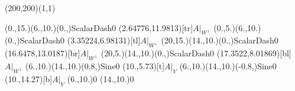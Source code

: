 \unitlength=1bp%

\begin{feynartspicture}(200,200)(1,1)

\FADiagram{}
\FAProp(0.,15.)(6.,10.)(0.,){ScalarDash}{0}
\FALabel(2.64776,11.9813)[tr]{$A|_{W^\perp}$}
\FAProp(0.,5.)(6.,10.)(0.,){ScalarDash}{0}
\FALabel(3.35224,6.98131)[tl]{$A|_{W^\perp}$}
\FAProp(20,15.)(14.,10.)(0.,){ScalarDash}{0}
\FALabel(16.6478,13.0187)[br]{$A|_{W^\perp}$}
\FAProp(20,5.)(14.,10.)(0.,){ScalarDash}{0}
\FALabel(17.3522,8.01869)[bl]{$A|_{W^\perp}$}
\FAProp(6.,10.)(14.,10.)(0.8,){Sine}{0}
\FALabel(10.,5.73)[t]{$A|_V$}
\FAProp(6.,10.)(14.,10.)(-0.8,){Sine}{0}
\FALabel(10.,14.27)[b]{$A|_V$}
\FAVert(6.,10.){0}
\FAVert(14.,10.){0}
\end{feynartspicture}

